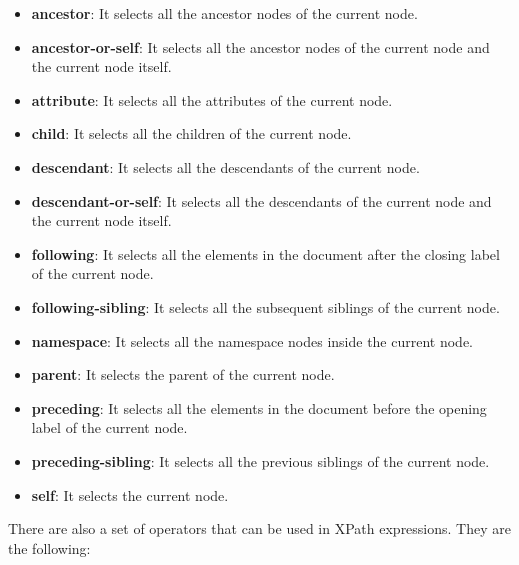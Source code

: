 \begin{itemize}

\item \textbf{ancestor}: It selects all the ancestor nodes of the current node.

\item \textbf{ancestor-or-self}: It selects all the ancestor nodes of the current node and the current node itself.

\item \textbf{attribute}: It selects all the attributes of the current node.

\item \textbf{child}: It selects all the children of the current node.

\item \textbf{descendant}: It selects all the descendants of the current node.

\item \textbf{descendant-or-self}: It selects all the descendants of the current node and the current node itself.

\item \textbf{following}: It selects all the elements in the document after the closing label of the current node.

\item \textbf{following-sibling}: It selects all the subsequent siblings of the current node.

\item \textbf{namespace}: It selects all the namespace nodes inside the current node.

\item \textbf{parent}: It selects the parent of the current node.

\item \textbf{preceding}: It selects all the elements in the document before the opening label of the current node.

\item \textbf{preceding-sibling}: It selects all the previous siblings of the current node.

\item \textbf{self}: It selects the current node.

\end{itemize}

There are also a set of operators that can be used in XPath expressions. They are the following:

